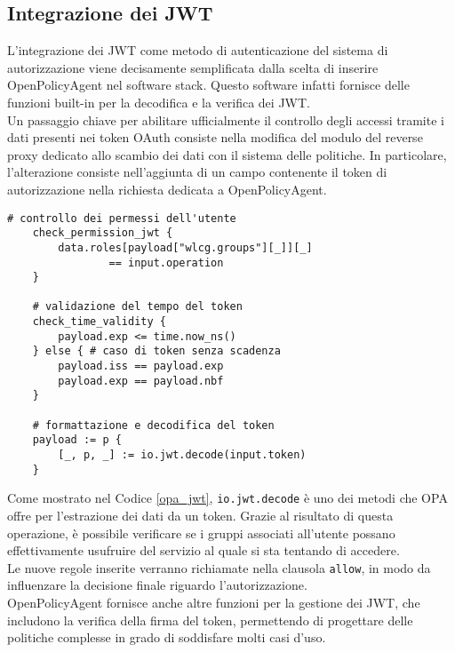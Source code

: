 \subsection{Integrazione dei JWT}
L'integrazione dei JWT come metodo di autenticazione del sistema di autorizzazione viene decisamente semplificata
dalla scelta di inserire OpenPolicyAgent nel software stack. 
Questo software infatti fornisce delle funzioni built-in per la decodifica e la verifica dei JWT.
\\ Un passaggio chiave per abilitare ufficialmente il controllo degli accessi tramite i dati presenti nei token OAuth
consiste nella modifica del modulo del reverse proxy dedicato allo scambio dei dati con il sistema delle politiche. In particolare, l'alterazione consiste 
nell'aggiunta di un campo contenente il token di autorizzazione nella richiesta dedicata a OpenPolicyAgent.
\begin{lstlisting}[caption={[Regole per la gestione dei token OAuth 2.0]Regole per la gestione dei token OAuth 2.0. Dopo che il token viene decodificato, si estrae il payload e se ne controlla la validità temporale.
    Infine, se i permessi associati al ruolo corrispondono all'operazione che l'utente sta tentando di eseguire, l'accesso è consentito.},captionpos=b,label=opa_jwt]
    # controllo dei permessi dell'utente
    check_permission_jwt {
        data.roles[payload["wlcg.groups"][_]][_]
                == input.operation
    }
    
    # validazione del tempo del token 
    check_time_validity {
        payload.exp <= time.now_ns()
    } else { # caso di token senza scadenza
        payload.iss == payload.exp
        payload.exp == payload.nbf
    }
    
    # formattazione e decodifica del token
    payload := p {
        [_, p, _] := io.jwt.decode(input.token)
    }
\end{lstlisting}
Come mostrato nel Codice \ref{opa_jwt}, \texttt{io.jwt.decode} è uno dei metodi che OPA offre per l'estrazione dei dati da un token.
Grazie al risultato di questa operazione, è possibile verificare se i gruppi associati all'utente possano effettivamente usufruire del servizio al quale si sta tentando di accedere.
\\ Le nuove regole inserite verranno richiamate nella clausola \texttt{allow}, in modo da influenzare la decisione finale riguardo l'autorizzazione. 
\\ OpenPolicyAgent fornisce anche altre funzioni per la gestione dei JWT, che includono la verifica della firma del token, 
permettendo di progettare delle politiche complesse in grado di soddisfare molti casi d'uso. 

